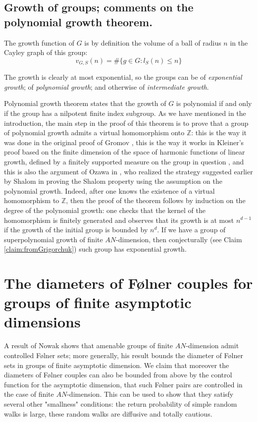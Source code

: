 \documentclass{amsart}
\numberwithin{figure}{section}
\theoremstyle{plain}
\theoremstyle{definition}
\begin{document}
\subsection{Growth of groups; comments on the polynomial growth theorem.} \label{subsection:growth}




The growth function of $G$ is by definition the volume of a ball of radius $n$
in the Cayley graph of this group:
$$
v_{G,S}(n)=\# \{ g \in G: l_{S}(n) \le n \}
$$

The growth is clearly at most exponential, so the groups can be of {\it exponential growth}; of {\it polynomial growth}; and otherwise of {\it intermediate growth}. 

Polynomial growth theorem \cite{gromovpolynomial} states that the growth of $G$ is polynomial if and only if the group has a nilpotent finite index subgroup.
As we have mentioned in the introduction, the main step in the proof of this theorem is to prove that a group of polynomial growth admits a virtual homomorphism onto $\mathbb{Z}$: this is the way it was done in the original proof of Gromov \cites{gromovpolynomial}, this is the way it works in Kleiner's proof based on the finite dimension of the space of harmonic functions of linear growth, defined by a finitely supported measure on the group in question  \cite{kleinerpolynomial}, and this is also the argument of Ozawa in \cite{ozawapolynomial}, who realized the strategy suggested earlier by Shalom in proving the Shalom property using the assumption on the polynomial growth.
Indeed, after one knows the existence of a virtual homomorphism to $\mathbb{Z}$, then the proof of the theorem follows by induction on the degree of the polynomial growth: one checks that the kernel of the homomorphism is finitely generated and observes that its growth is at most $n^{d-1}$ if the growth of the initial group is bounded by $n^d$.
If we have a group of  superpolynomial growth of finite $AN$-dimension, then 
conjecturally (see Claim \ref{claim:fromGrigorchuk}) such group has exponential growth. 



\section{The diameters of F{\o}lner couples
for groups of finite asymptotic dimensions}

A result of Nowak shows that amenable groups of finite $AN$-dimension admit
controlled F{\o}lner sets; more generally, his result bounds the diameter
of F{\o}lner sets in groups of finite asymptotic dimension.
We claim that moreover the diameters of F{\o}lner couples can also be bounded from above by the control function for the asymptotic dimension, 
that such F{\o}lner pairs are controlled in the case of finite $AN$-dimension. 
This can be used to show that they satisfy several other "smallness" conditions: the return probability of simple
random walks is large, these random walks are diffusive 
and totally cautious. 
\end{document}
